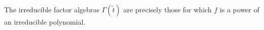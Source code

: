 The irreducible factor algebras $\Gamma(\tilde{t})$ are precisely those for which $f$ is a power of an irreducible polynomial.
